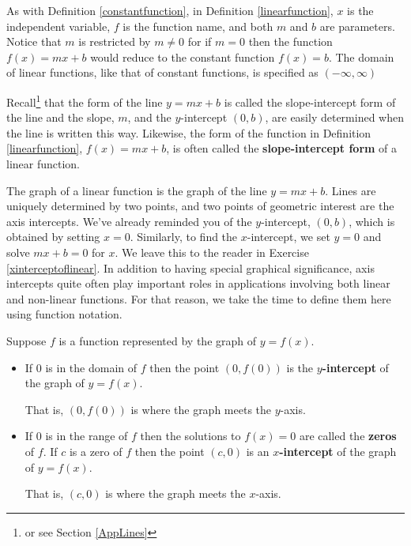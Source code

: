 \documentclass{ximera}
\begin{document}
As with Definition \ref{constantfunction},  in Definition \ref{linearfunction}, $x$ is the independent variable, $f$ is the function name, and both $m$ and $b$ are parameters.  Notice that $m$ is restricted by $m \neq 0$ for if $m = 0$ then the function $f(x) = mx + b$ would reduce to the constant function $f(x) = b$.  The domain of linear functions, like that of constant functions,  is specified as $(-\infty, \infty)$



Recall\footnote{or see Section \ref{AppLines}} that the form of the line $y = mx + b$ is called the slope-intercept form of the line and the slope,  $m$, and the $y$-intercept $(0, b)$, are easily determined when the line is written this way. Likewise, the form of the function in Definition \ref{linearfunction}, $f(x) = mx + b$, is often called the  \textbf{slope-intercept form} of a linear function.



The graph of a linear function is the graph of the line  $y = mx + b$.   Lines are uniquely determined by two points, and two points of geometric interest are the axis intercepts.  We've already reminded you of the $y$-intercept, $(0,b)$, which is obtained by setting $x = 0$. Similarly, to find the $x$-intercept, we set $y = 0$ and solve $mx + b = 0$ for $x$.  We leave this to the reader in Exercise \ref{xinterceptoflinear}.  In addition to having special graphical significance, axis intercepts quite often play important roles in applications involving both linear and non-linear functions.   For that reason, we take the time to define them here using function notation.



\colorbox{ResultColor}{\bbm

\begin{defn}

\label{interceptdefns}

Suppose $f$ is a function represented by the graph of $y = f(x)$.

\begin{itemize}

\item  If $0$ is in the domain of $f$ then the point $(0, f(0))$ is the   \textbf{$y$-intercept} of the graph of $y = f(x)$.

That is, $(0,f(0))$ is where the graph meets the $y$-axis.

\item  If $0$ is in the range of $f$ then the solutions to $f(x) = 0$ are called the  \textbf{zeros} of $f$.  If $c$ is a zero of $f$ then the point $(c,0)$ is an   \textbf{$x$-intercept} of the graph of $y = f(x)$.

That is, $(c,0)$ is where the graph meets the $x$-axis.

\end{itemize}

\end{defn}

\ebm}
\end{document}
